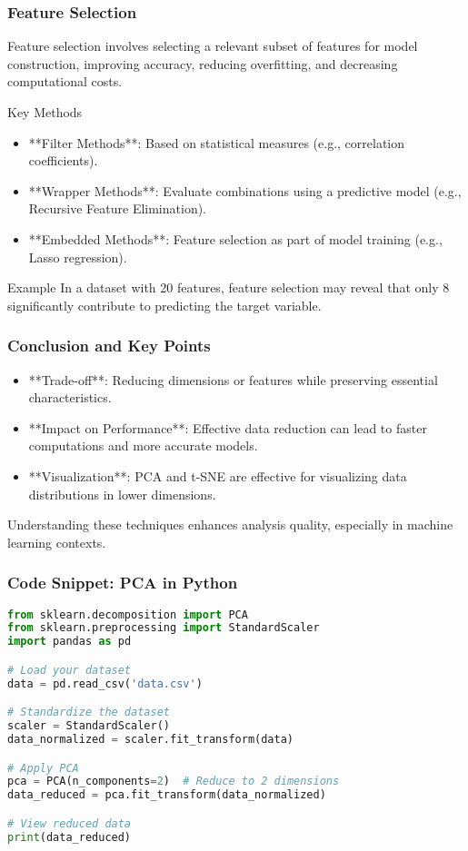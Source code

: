 \documentclass{beamer}
\begin{document}
\begin{frame}[fragile]
    \frametitle{Feature Selection}
    Feature selection involves selecting a relevant subset of features for model construction, improving accuracy, reducing overfitting, and decreasing computational costs.
    \begin{block}{Key Methods}
        \begin{itemize}
            \item **Filter Methods**: Based on statistical measures (e.g., correlation coefficients).
            \item **Wrapper Methods**: Evaluate combinations using a predictive model (e.g., Recursive Feature Elimination).
            \item **Embedded Methods**: Feature selection as part of model training (e.g., Lasso regression).
        \end{itemize}
    \end{block}
    \begin{block}{Example}
        In a dataset with 20 features, feature selection may reveal that only 8 significantly contribute to predicting the target variable.
    \end{block}
\end{frame}

\begin{frame}[fragile]
    \frametitle{Conclusion and Key Points}
    \begin{itemize}
        \item **Trade-off**: Reducing dimensions or features while preserving essential characteristics.
        \item **Impact on Performance**: Effective data reduction can lead to faster computations and more accurate models.
        \item **Visualization**: PCA and t-SNE are effective for visualizing data distributions in lower dimensions.
    \end{itemize}
    Understanding these techniques enhances analysis quality, especially in machine learning contexts.
\end{frame}

\begin{frame}[fragile]
    \frametitle{Code Snippet: PCA in Python}
    \begin{lstlisting}[language=Python]
from sklearn.decomposition import PCA
from sklearn.preprocessing import StandardScaler
import pandas as pd

# Load your dataset
data = pd.read_csv('data.csv')

# Standardize the dataset
scaler = StandardScaler()
data_normalized = scaler.fit_transform(data)

# Apply PCA
pca = PCA(n_components=2)  # Reduce to 2 dimensions
data_reduced = pca.fit_transform(data_normalized)

# View reduced data
print(data_reduced)
    \end{lstlisting}
\end{frame}
\end{document}
